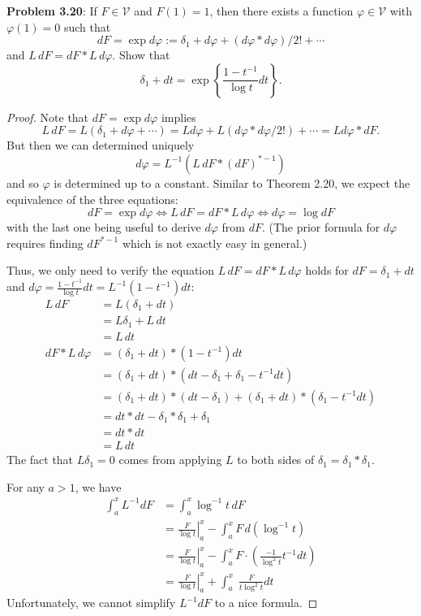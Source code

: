 \documentclass[12pt]{article}
\newcommand{\V}{\mathcal{V}}
\begin{document}
\fi

\textbf{Problem 3.20}: If $F \in \V$ and $F(1) = 1$, then there exists a function $\varphi \in \V$ with $\varphi(1) = 0$ such that
$$dF = \exp d\varphi := \delta_1 + d\varphi + (d\varphi * d\varphi)/2! + \cdots$$
and $L \, dF = dF * L\, d\varphi$. Show that
$$\delta_1 + dt = \exp \left\{ \frac{1 - t^{-1}}{\log t} dt\right\}.$$

\begin{proof}
Note that $dF = \exp d\varphi$ implies
$$L \, dF = L \left( \delta_1 + d\varphi + \cdots \right) = L d\varphi + L(d\varphi * d\varphi / 2!) + \cdots = L d\varphi * dF.$$
But then we can determined uniquely
$$d\varphi = L^{-1} (L \, dF * (dF)^{*-1})$$
and so $\varphi$ is determined up to a constant. Similar to Theorem 2.20, we expect the equivalence of the three equations:
$$dF = \exp d\varphi \iff L \, dF = dF * L\, d\varphi \iff d\varphi = \log dF$$
with the last one being useful to derive $d\varphi$ from $dF$. (The prior formula for $d\varphi$ requires finding $dF^{*-1}$ which is not exactly easy in general.)

Thus, we only need to verify the equation $L \, dF = dF * L\, d\varphi$ holds for $dF = \delta_1 + dt$ and $d\varphi = \frac{1 - t^{-1}}{\log t} dt = L^{-1} (1 - t^{-1}) dt$:
\begin{align*}
L \, dF &= L (\delta_1 + dt)\\
&= L \delta_1 + L \, dt\\
&= L \, dt\\
dF * L\, d\varphi &= (\delta_1 + dt) * (1 - t^{-1}) dt\\
&= (\delta_1 + dt) * (dt - \delta_1 + \delta_1 - t^{-1} dt)\\
&= (\delta_1 + dt) * (dt - \delta_1) + (\delta_1 + dt) * (\delta_1 - t^{-1} dt)\\
&= dt * dt - \delta_1 * \delta_1 + \delta_1\\
&= dt * dt\\
&= L \, dt
\end{align*}
The fact that $L \delta_1 = 0$ comes from applying $L$ to both sides of $\delta_1 = \delta_1 * \delta_1$.

For any $a > 1$, we have
\begin{align*}
\int_a^x L^{-1} dF &= \int_a^x \log^{-1} t \, dF\\
&= \left. \frac{F}{\log t}\right|_a^x - \int_a^x F \, d(\log^{-1} t)\\
&= \left. \frac{F}{\log t}\right|_a^x - \int_a^x F \cdot \left(\frac{-1}{\log^2 t} t^{-1} dt \right)\\
&= \left. \frac{F}{\log t}\right|_a^x + \int_a^x \; \frac{F}{t \log^2 t} dt
\end{align*}
Unfortunately, we cannot simplify $L^{-1} dF$ to a nice formula.
\end{proof}
\end{document}
